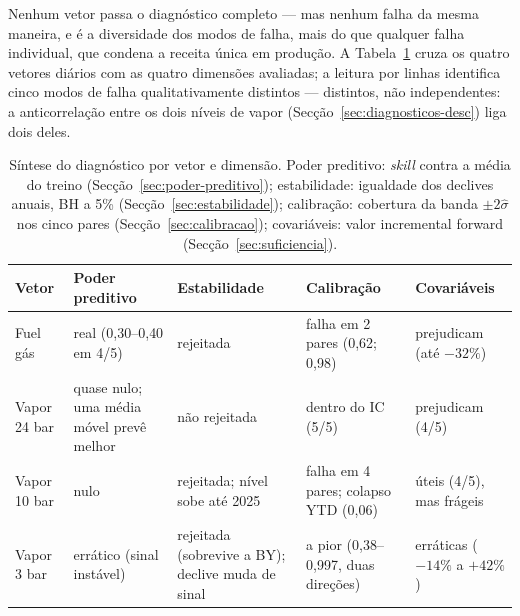 Nenhum vetor passa o diagnóstico completo --- mas nenhum falha da mesma
maneira, e é a diversidade dos modos de falha, mais do que qualquer falha
individual, que condena a receita única em produção. A
Tabela~\ref{tab:sintese-vectores} cruza os quatro vetores diários com as
quatro dimensões avaliadas; a leitura por linhas identifica cinco modos de
falha qualitativamente distintos --- distintos, não independentes: a
anticorrelação entre os dois níveis de vapor
(Secção~\ref{sec:diagnosticos-desc}) liga dois deles.

\begin{table}[htbp]
  \centering
  \caption[Síntese do diagnóstico por vetor]{Síntese do diagnóstico por
  vetor e dimensão. Poder preditivo: \emph{skill} contra a média do treino
  (Secção~\ref{sec:poder-preditivo}); estabilidade: igualdade dos declives
  anuais, BH a 5\% (Secção~\ref{sec:estabilidade}); calibração: cobertura da
  banda $\pm 2\hat\sigma$ nos cinco pares (Secção~\ref{sec:calibracao});
  covariáveis: valor incremental forward (Secção~\ref{sec:suficiencia}).}
  \label{tab:sintese-vectores}
  \small
  \begin{tabular}{lp{2.5cm}p{2.6cm}p{2.9cm}p{2.9cm}}
    \toprule
    Vetor & Poder preditivo & Estabilidade & Calibração & Covariáveis \\
    \midrule
    Fuel gás & real (0{,}30--0{,}40 em 4/5) & rejeitada & falha em 2 pares (0{,}62; 0{,}98) & prejudicam (até $-32\%$) \\
    Vapor 24 bar & quase nulo; uma média móvel prevê melhor & não rejeitada & dentro do IC (5/5) & prejudicam (4/5) \\
    Vapor 10 bar & nulo & rejeitada; nível sobe até 2025 & falha em 4 pares; colapso YTD (0{,}06) & úteis (4/5), mas frágeis \\
    Vapor 3 bar & errático (sinal instável) & rejeitada (sobrevive a BY); declive muda de sinal & a pior (0{,}38--0{,}997, duas direções) & erráticas ($-14\%$ a $+42\%$) \\
    \bottomrule
  \end{tabular}
\end{table}

